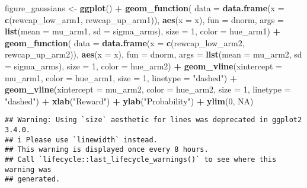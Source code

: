 \documentclass[
]{article}
\newenvironment{Shaded}{\begin{snugshade}}{\end{snugshade}}
\newcommand{\AttributeTok}[1]{\textcolor[rgb]{0.13,0.29,0.53}{#1}}
\newcommand{\ConstantTok}[1]{\textcolor[rgb]{0.56,0.35,0.01}{#1}}
\newcommand{\DecValTok}[1]{\textcolor[rgb]{0.00,0.00,0.81}{#1}}
\newcommand{\FunctionTok}[1]{\textcolor[rgb]{0.13,0.29,0.53}{\textbf{#1}}}
\newcommand{\NormalTok}[1]{#1}
\newcommand{\OtherTok}[1]{\textcolor[rgb]{0.56,0.35,0.01}{#1}}
\newcommand{\SpecialCharTok}[1]{\textcolor[rgb]{0.81,0.36,0.00}{\textbf{#1}}}
\newcommand{\StringTok}[1]{\textcolor[rgb]{0.31,0.60,0.02}{#1}}
\begin{document}
\begin{Shaded}
\begin{Highlighting}[]
\NormalTok{figure\_gaussians }\OtherTok{\textless{}{-}} \FunctionTok{ggplot}\NormalTok{() }\SpecialCharTok{+}
  \FunctionTok{geom\_function}\NormalTok{(}
    \AttributeTok{data =} \FunctionTok{data.frame}\NormalTok{(}\AttributeTok{x =} \FunctionTok{c}\NormalTok{(rewcap\_low\_arm1, rewcap\_up\_arm1)), }\FunctionTok{aes}\NormalTok{(}\AttributeTok{x =}\NormalTok{ x), }\AttributeTok{fun =}\NormalTok{ dnorm,}
    \AttributeTok{args =} \FunctionTok{list}\NormalTok{(}\AttributeTok{mean =}\NormalTok{ mu\_arm1, }\AttributeTok{sd =}\NormalTok{ sigma\_arms), }\AttributeTok{size =} \DecValTok{1}\NormalTok{, }\AttributeTok{color =}\NormalTok{ hue\_arm1) }\SpecialCharTok{+}
  \FunctionTok{geom\_function}\NormalTok{(}
    \AttributeTok{data =} \FunctionTok{data.frame}\NormalTok{(}\AttributeTok{x =} \FunctionTok{c}\NormalTok{(rewcap\_low\_arm2, rewcap\_up\_arm2)), }\FunctionTok{aes}\NormalTok{(}\AttributeTok{x =}\NormalTok{ x), }\AttributeTok{fun =}\NormalTok{ dnorm,}
    \AttributeTok{args =} \FunctionTok{list}\NormalTok{(}\AttributeTok{mean =}\NormalTok{ mu\_arm2, }\AttributeTok{sd =}\NormalTok{ sigma\_arms), }\AttributeTok{size =} \DecValTok{1}\NormalTok{, }\AttributeTok{color =}\NormalTok{ hue\_arm2) }\SpecialCharTok{+}
  \FunctionTok{geom\_vline}\NormalTok{(}\AttributeTok{xintercept =}\NormalTok{ mu\_arm1, }\AttributeTok{color =}\NormalTok{ hue\_arm1, }\AttributeTok{size =} \DecValTok{1}\NormalTok{, }\AttributeTok{linetype =} \StringTok{"dashed"}\NormalTok{) }\SpecialCharTok{+} 
  \FunctionTok{geom\_vline}\NormalTok{(}\AttributeTok{xintercept =}\NormalTok{ mu\_arm2, }\AttributeTok{color =}\NormalTok{ hue\_arm2, }\AttributeTok{size =} \DecValTok{1}\NormalTok{, }\AttributeTok{linetype =} \StringTok{"dashed"}\NormalTok{) }\SpecialCharTok{+}
  \FunctionTok{xlab}\NormalTok{(}\StringTok{"Reward"}\NormalTok{) }\SpecialCharTok{+} 
  \FunctionTok{ylab}\NormalTok{(}\StringTok{"Probability"}\NormalTok{) }\SpecialCharTok{+}
  \FunctionTok{ylim}\NormalTok{(}\DecValTok{0}\NormalTok{, }\ConstantTok{NA}\NormalTok{)}
\end{Highlighting}
\end{Shaded}

\begin{verbatim}
## Warning: Using `size` aesthetic for lines was deprecated in ggplot2 3.4.0.
## i Please use `linewidth` instead.
## This warning is displayed once every 8 hours.
## Call `lifecycle::last_lifecycle_warnings()` to see where this warning was
## generated.
\end{verbatim}
\end{document}
